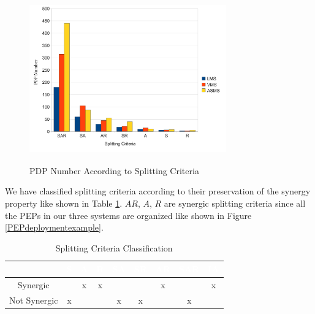 \begin{figure}[!h]
\centering
\includegraphics[width=8.5cm, height=7.2cm]{pdpnumber.pdf}
\begin{center}
\caption{PDP Number According to Splitting Criteria}
\label{pdpnumber}
\end{center}
\end{figure}

We have classified splitting criteria according to their preservation of the synergy property like shown in 
Table \ref{Classification}. $AR$, $A$, $R$ are synergic splitting criteria since all the PEPs in our three systems 
are organized like shown in Figure \ref{PEPdeploymentexample}. 

\begin{table}[t]
\centering
\begin{tabular}{|>{\tiny}c|>{\tiny}c|>{\tiny}c|>{\tiny}c|>{\tiny}c|>{\tiny}c|>{\tiny}c|>{\tiny}c|>{\tiny}c|}   
\hline  \rowcolor{black} \scriptsize \bf \textcolor {white}{}
& \scriptsize \bf \textcolor {white}{S}
& \scriptsize \bf \textcolor {white}{A}
& \scriptsize \bf \textcolor  {white}{R}
& \scriptsize \bf \textcolor  {white}{SA}
& \scriptsize \bf \textcolor  {white}{SR}
& \scriptsize \bf \textcolor  {white}{AR} 
& \scriptsize \bf \textcolor  {white}{SAR}
& \scriptsize \bf \textcolor {white}{IA}\\ \hline
\scriptsize  {Synergic}
&\scriptsize  {}
& \scriptsize {x}
& \scriptsize {x}
& \scriptsize {}
& \scriptsize {}
& \scriptsize {x}
& \scriptsize {}
& \scriptsize {x}
  \\ \hline
\scriptsize  {Not Synergic}
&\scriptsize  {x}
& \scriptsize {}
& \scriptsize {}
& \scriptsize {x}
& \scriptsize {x}
& \scriptsize {}
& \scriptsize {x}
& \scriptsize {}
  \\ \hline
\end{tabular}
\caption{Splitting Criteria Classification}
\label{Classification}
\end{table}

